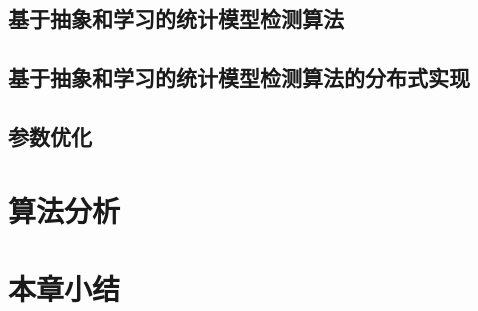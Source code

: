 \subsection{基于抽象和学习的统计模型检测算法}
\subsection{基于抽象和学习的统计模型检测算法的分布式实现}
\subsection{参数优化}
\section{算法分析}
\section{本章小结}

